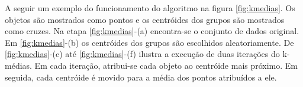 A seguir um exemplo do funcionamento do algoritmo na figura \ref{fig:kmedias}. Os objetos são mostrados como pontos e os centróides dos grupos são mostrados como cruzes. Na etapa \ref{fig:kmedias}-(a) encontra-se o conjunto de dados original. Em \ref{fig:kmedias}-(b) os centróides dos grupos são escolhidos aleatoriamente. De \ref{fig:kmedias}-(c) até \ref{fig:kmedias}-(f) ilustra a execução de duas iterações do k-médias. Em cada iteração, atribui-se cada objeto ao centróide mais próximo. Em seguida, cada centróide é movido para a média dos pontos atribuídos a ele.
\begin{figure}[!ht]
	\centering
\end{figure}


